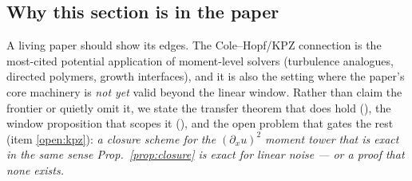 \subsection{Why this section is in the paper}

A living paper should show its edges. The Cole--Hopf/KPZ connection is the
most-cited potential application of moment-level solvers (turbulence
analogues, directed polymers, growth interfaces), and it is also the setting
where the paper's core machinery is \emph{not yet} valid beyond the linear
window. Rather than claim the frontier or quietly omit it, we state the
transfer theorem that does hold (\tagP), the window proposition that scopes
it (\tagS), and the open problem that gates the rest (item \ref{open:kpz}):
\emph{a closure scheme for the $(\partial_xu)^2$ moment tower that is exact in
the same sense Prop.~\ref{prop:closure} is exact for linear noise --- or a
proof that none exists.}
